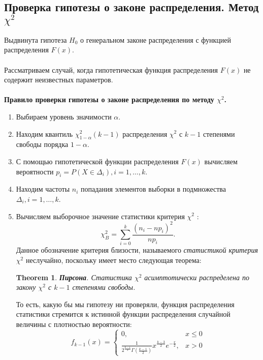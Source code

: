 \documentclass[12pt]{article}
\newtheorem{theorem}{Theorem}
\begin{document}
	\subsection{Проверка гипотезы о законе распределения. Метод $\chi^2$}
	Выдвинута гипотеза $H_0$ о генеральном законе распределения с функцией распределения $F(x)$.\\
	\phantom{0}\\
	Рассматриваем случай, когда гипотетическая функция распределения $F(x)$ не содержит неизвестных параметров.\\
	\phantom{0}\\
	\textbf{Правило проверки гипотезы о законе распределения по методу $\chi^2$.}\cite{lit1}
	\begin{enumerate}
		\item Выбираем уровень значимости $\alpha$.

		\item Находим квантиль $\chi^2_{1-\alpha}(k-1)$ распределения $\chi^2$ с $k-1$ степенями свободы порядка $1-\alpha$.

		\item С помощью гипотетической функции распределения $F(x)$ вычисляем
		вероятности $p_i = P(X\in \Delta_i), i=1,\dots,k$.

		\item Находим частоты $n_i$ попадания элементов выборки в подмножества
		$\Delta_i, i = 1,\dots,k$.

		\item Вычисляем выборочное значение статистики критерия $\chi^2$ :
		\begin{equation}
 		\chi^2_B = \sum_{i=0}^{k} \frac{(n_i - np_i)^2}{np_i}.
 		\label{hi2}
 		\end{equation}
Данное обозначение критерия близости, называемого \textit{статистикой критерия $\chi^2$} неслучайно, поскольку имеет место следующая теорема:
	
\begin{theorem} \textbf{Пирсона}.
		Статистика $\chi^2$ асимптотически распределена по закону $\chi^2$ с $k-1$ степенями свободы.
\end{theorem}

То есть, какую бы мы гипотезу ни проверяли, функция распределения статистики стремится к истинной функции распределения случайной величины с плотностью вероятности:
\begin{equation}
	f_{k-1}(x)=
	\begin{cases}
	0, & x \leq 0 \\
	\frac{1}{2^{\frac{k-1}{2}}\Gamma\left({\frac{k-1}{2}}\right)}x^{\frac{k-3}{2}}e^{-\frac{x}{2}}, & x > 0
	\end{cases}
	\end{equation}


\end{enumerate}
\end{document}
